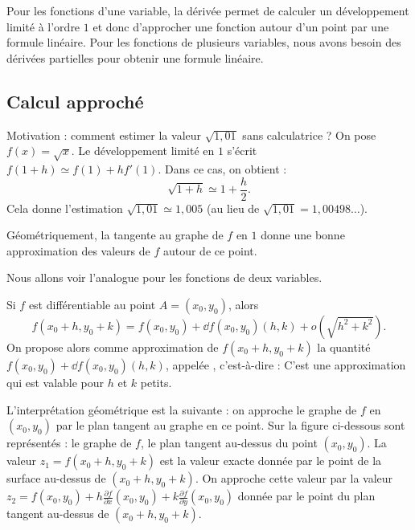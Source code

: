 \documentclass[11pt, class=report,crop=false]{standalone}
\begin{document}
Pour les fonctions d'une variable, la dérivée permet de calculer un développement limité à l'ordre $1$ et donc d'approcher une fonction autour d'un point par une formule linéaire. Pour les fonctions de plusieurs variables, nous avons besoin des dérivées partielles pour obtenir une formule linéaire.

\subsection{Calcul approché}

Motivation : comment estimer la valeur $\sqrt{1,01}$ sans calculatrice ?
On pose $f(x)=\sqrt{x}$. Le développement limité en $1$ s'écrit
$f(1+h) \simeq f(1) + hf'(1)$. Dans ce cas, on obtient :
$$\sqrt{1+h} \simeq 1 + \frac{h}{2}.$$
Cela donne l'estimation  $\sqrt{1,01} \simeq 1,005$ (au lieu de 
$\sqrt{1,01} = 1,00498\ldots$).

Géométriquement, la tangente au graphe de $f$ en $1$ donne une bonne approximation des valeurs de $f$ autour de ce point.

\bigskip

Nous allons voir l'analogue pour les fonctions de deux variables.

Si $f$ est différentiable au point $A = (x_0,y_0)$, alors
$$f(x_0+h,y_0+k) = f(x_0,y_0) + \dd f(x_0,y_0) (h,k) + o(\sqrt{h^2+k^2}).$$
On propose alors comme approximation de $f(x_0+h,y_0+k)$ la quantité 
$f(x_0,y_0) + \dd f(x_0,y_0) (h,k)$, appelée , c'est-à-dire :
C'est une approximation qui est valable pour $h$ et $k$ petits.

L'interprétation géométrique est la suivante : 
on approche le graphe de $f$ en $(x_0,y_0)$ par le plan tangent au graphe en ce point. Sur la figure ci-dessous sont représentés : le graphe de $f$, le plan tangent au-dessus du point $(x_0,y_0)$. La valeur $z_1 = f(x_0+h,y_0+k)$ est la valeur exacte donnée par le point de la surface au-dessus de $(x_0+h,y_0+k)$. On approche cette valeur par la valeur $z_2 = f(x_0,y_0) + h\frac{\partial f}{\partial x}(x_0,y_0)
+k\frac{\partial f}{\partial y}(x_0,y_0)$ donnée par le point du plan tangent au-dessus de $(x_0+h,y_0+k)$. 


\end{document}
